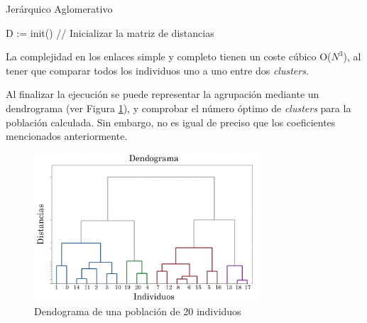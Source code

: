 		\begin{algorithm}[!h]
			\caption{Jerárquico Aglomerativo}
			D := init() // Inicializar la matriz de distancias\\
			
		\end{algorithm}
		\vspace{-0.20cm}

		\noindent La complejidad en los enlaces simple y completo tienen un coste cúbico O(\(N^{3}\)), al tener que comparar todos los individuos uno a uno entre dos \textit{clusters}.
		

		Al finalizar la ejecución se puede representar la agrupación mediante un dendrograma \cite{espinoza2012using} (ver Figura \ref{fig:dendograma}), y comprobar el número óptimo de \textit{clusters} para la población calculada. Sin embargo, no es igual de preciso que los coeficientes mencionados anteriormente. 
		
		\begin{figure}[!h]
			\centering
			\includegraphics[width=0.75\textwidth]{images/chapter_2/dendograma}
			\caption{Dendograma de una población de 20 individuos}
			\label{fig:dendograma}
		\end{figure}


